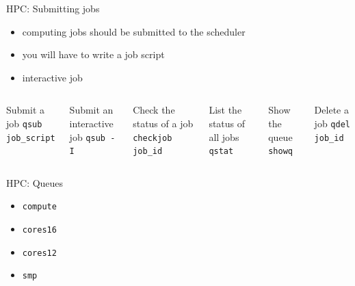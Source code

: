 \documentclass{beamer}
\begin{document}
\begin{frame}{HPC: Submitting jobs}
	\begin{itemize}
		\item computing jobs should be submitted to the scheduler
		\item you will have to write a job script
		\item interactive job
	\end{itemize}
    \begin{Examples}
	    \begin{columns}
		\begin{block}{Submit a job}
			\texttt{qsub job\_script}
		\end{block}
		\begin{block}{Submit an interactive job}
			\texttt{qsub -I}
		\end{block}
		\begin{block}{Check the status of a job}
			\texttt{checkjob job\_id}
		\end{block}

		\begin{block}{List the status of all jobs}
			\texttt{qstat}
		\end{block}
		\begin{block}{Show the queue}
			\texttt{showq}
		\end{block}		
		\begin{block}{Delete a job}
			\texttt{qdel job\_id}
		\end{block}
	    \end{columns}		
    \end{Examples}
\end{frame}

\begin{frame}{HPC: Queues}
	\begin{itemize}
		\item \texttt{compute}
		\item \texttt{cores16}
		\item \texttt{cores12}
		\item \texttt{smp}
	\end{itemize}
\end{frame}
\end{document}
